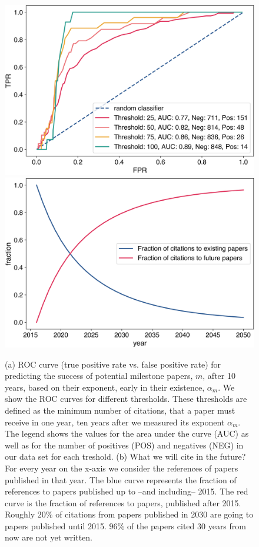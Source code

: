 \documentclass[draft,final]{vutinfth} %
\begin{document}
\begin{figure}[h!]
	\centering
	  \includegraphics[width=0.7\columnwidth]{figures_aps/6.png}
	  \includegraphics[width=0.7\columnwidth]{figures_aps/3.png}
		\caption{(a) ROC curve (true positive rate vs. false positive rate) for predicting the success of potential milestone papers, $m$, after 10 years, based on their exponent, early in their existence, $\alpha_m$. We show the ROC curves for different thresholds. These thresholds are defined as the minimum number of citations, that a paper must receive in one year, ten years after we measured its exponent $\alpha_m$. The legend shows the values for the area under the curve (AUC) as well as for the number of positives (POS) and negatives (NEG) in our data set for each treshold.
		(b) What we will cite in the future? For every year on the x-axis we consider the references of papers published in that year. The blue curve represents the fraction of references to papers published up to --and including-- 2015. The red curve is the fraction of references to papers, published after 2015. Roughly 20\% of citations from papers published in 2030 are going to papers published until 2015. $96\%$ of the papers cited 30 years from now are not yet written. 
		}
	\label{fig:roc}
\end{figure}
\end{document}
